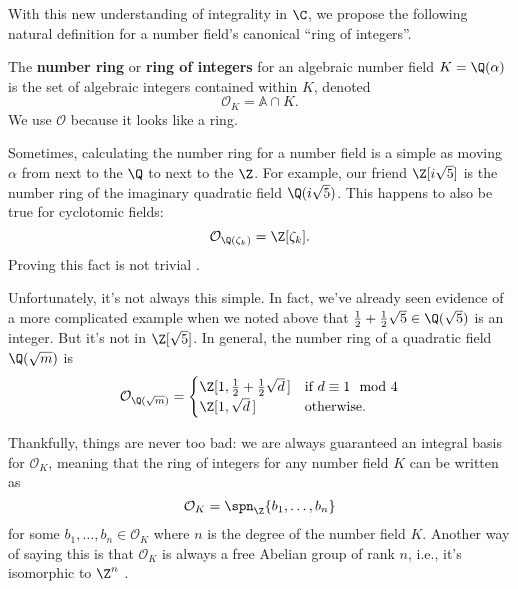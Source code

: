 With this new understanding of integrality in $\C$, we propose the following natural definition for a number field's canonical ``ring of integers''.

\begin{definition}
    The \textbf{number ring} or \textbf{ring of integers} for an algebraic number field $K = \Q(\alpha)$ is the set of algebraic integers contained within $K$, denoted
    \begin{equation*}
        \mathcal O_K = \mathbb A \cap K.
    \end{equation*}
    We use $\mathcal O$ because it looks like a ring.
\end{definition}

Sometimes, calculating the number ring for a number field is a simple as moving $\alpha$ from next to the $\Q$ to next to the $\Z$. For example, our friend $\Z[i \sqrt 5]$ is the number ring of the imaginary quadratic field $\Q(i \sqrt{5})$. This happens to also be true for cyclotomic fields:
\begin{equation}
    \mathcal O_{\Q(\zeta_k)} = \Z[\zeta_k].
\end{equation}
Proving this fact is not trivial \cite[22]{marcus}.

Unfortunately, it's not always this simple. In fact, we've already seen evidence of a more complicated example when we noted above that $\frac12 + \frac12 \sqrt 5 \in \Q(\sqrt 5)$ is an integer. But it's not in $\Z[\sqrt 5]$. In general, the number ring of a quadratic field $\Q(\sqrt m)$ is
\begin{equation}
    \mathcal O_{\Q(\sqrt m)} = \begin{cases}
        \Z[1, \frac12 + \frac12 \sqrt d \, ] & \text{if $d \equiv 1 \mod 4$} \\
        \Z[1, \sqrt d \, ]                   & \text{otherwise}.
    \end{cases}
\end{equation}

Thankfully, things are never too bad: we are always guaranteed an integral basis for $\mathcal O_K$, meaning that the ring of integers for any number field $K$ can be written as
\begin{equation}
    \mathcal O_K = \spn_\Z \{ b_1, \ldots, b_n \}
\end{equation}
for some $b_1, \ldots, b_n \in \mathcal O_K$ where $n$ is the degree of the number field $K$. Another way of saying this is that $\mathcal O_K$ is always a free Abelian group of rank $n$, i.e., it's isomorphic to $\Z^n$ \cite[20]{marcus}.

